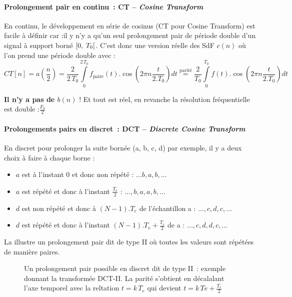 \paragraph{Prolongement pair en continu~: CT -- \emph{Cosine Transform}}
En continu, le développement en série de cosinus (CT pour Cosine
Transform) est facile à définir car :il y n'y a qu'un seul
prolongement pair de période double d'un signal à support borné
$\ST0$. C'est donc une version réelle des SdF $c(n)$ où l'on prend une
période double avec :
$$CT[n] = a(\frac{n}{2}) = \frac{2}{2\,T_0}\int\limits_0^{2\,T_0} f_{\text{paire}}(t) . \cos\left(2\pi n \frac{t}{2.T_0}\right) dt \overset{\text{parité}}{=} \frac{2}{T_0}\int\limits_0^{T_0} f(t) . \cos\left(2\pi n \frac{t}{2.T_0}\right) dt$$

\textbf{Il n'y a pas de $b(n)$} ! Et tout est réel, en revanche la
résolution fréquentielle est double :$\frac{F_0}{2}$

\paragraph{Prolongements pairs en discret~: DCT -- \emph{Discrete Cosine Transform}}

En discret pour prolonger la suite bornée (a, b, c, d) par exemple, il
y a deux choix à faire à chaque borne :
\begin{itemize}
  \item $a$ est à l'instant 0 et donc non répété : $\ldots b,a,b,\ldots{}$
  \item $a$ est répété et donc à l'instant $\frac{T_e}{2}$ : $\ldots, b, a, a, b, \dots$
  \item $d$ est non répété et donc à $(N-1).T_e$ de l'échantillon a : $\ldots, c, d, c, \dots$ 
  \item $d$ est répété et donc à l'instant $(N-1).T_e + \frac{T_e}{2}$ de a : $\ldots, c, d, d, c, \dots$    
\end{itemize}

La  illustre un prolongement pair dit de type II où toutes les valeurs sont répétées de manière paires.
\begin{figure}[htbp]
  \centering {}
  \caption{Un prolongement pair possible en discret dit de type II~:
    exemple donnant la transformée DCT-II. La parité s'obtient en
    décalalant l'axe temporel avec la reltation $t=k\,T_e$ qui devient
    $t=k\,Te + \frac{T_e}{2}$ }
  \label{fig:DCT_II}
\end{figure}


